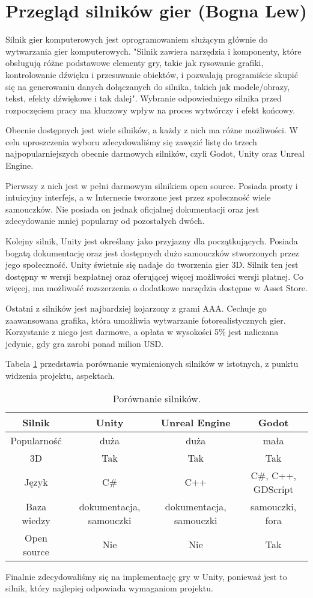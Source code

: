 \section{Przegląd silników gier (Bogna Lew)}\label{s:silniki}
Silnik gier komputerowych jest oprogramowaniem służącym głównie do wytwarzania gier komputerowych. "Silnik zawiera
narzędzia i komponenty, które obsługują różne podstawowe elementy gry, takie jak rysowanie grafiki, kontrolowanie
dźwięku i przesuwanie obiektów, i pozwalają programiście skupić się na generowaniu danych dołączanych do silnika, takich
jak modele/obrazy, tekst, efekty dźwiękowe i tak dalej"\cite{design_essent}. Wybranie odpowiedniego silnika przed
rozpoczęciem pracy ma kluczowy wpływ na proces wytwórczy i efekt końcowy.

Obecnie dostępnych jest wiele silników, a każdy z nich ma różne możliwości. W celu uproszczenia wyboru zdecydowaliśmy
się zawęzić listę do trzech najpopularniejszych obecnie darmowych silników, czyli Godot, Unity oraz Unreal Engine.

Pierwszy z nich jest w pełni darmowym silnikiem open source. Posiada prosty i intuicyjny interfejs, a w Internecie
tworzone jest przez społeczność wiele samouczków. Nie posiada on jednak oficjalnej dokumentacji oraz jest zdecydowanie
mniej popularny od pozostałych dwóch.

Kolejny silnik, Unity jest określany jako przyjazny dla początkujących. Posiada bogatą dokumentację oraz jest dostępnych
dużo samouczków stworzonych przez jego społeczność. Unity świetnie się nadaje do tworzenia gier 3D. Silnik ten jest
dostępny w wersji bezpłatnej oraz oferującej więcej możliwości wersji płatnej. Co więcej, ma możliwość rozszerzenia
o dodatkowe narzędzia dostępne w Asset Store.

Ostatni z silników jest najbardziej kojarzony z grami AAA. Cechuje go zaawansowana grafika, która umożliwia wytwarzanie
fotorealistycznych gier. Korzystanie z niego jest darmowe, a opłata w wysokości 5\% jest naliczana jedynie, gdy gra
zarobi ponad milion USD.

Tabela \ref{fig:teng} przedstawia porównanie wymienionych silników w istotnych, z punktu widzenia projektu, aspektach.

\begin{table}[h]
\caption{Porównanie silników.}
\begin{center}
\begin{tabular}{ |c||c|c|c| }
 \hline
 Silnik & Unity & Unreal Engine & Godot \\
 \hline \hline
 Popularność & duża & duża & mała \\
 \hline
 3D & Tak & Tak & Tak \\
 \hline
 Język & C\# & C++ & C\#, C++, GDScript \\
 \hline
 Baza wiedzy & dokumentacja, samouczki & dokumentacja, samouczki & samouczki, fora \\
 \hline
 Open source & Nie & Nie & Tak \\
 \hline
\end{tabular}
\end{center}
\label{fig:teng} 
\end{table}

Finalnie zdecydowaliśmy się na implementację gry w Unity, ponieważ jest to silnik, który najlepiej odpowiada wymaganiom projektu.
